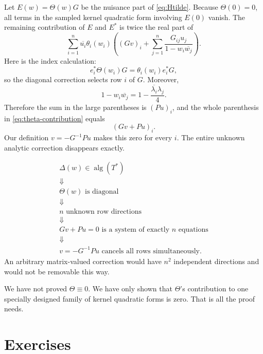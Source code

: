 \documentclass[11pt,oneside,openany]{book}
\theoremstyle{definition}
\theoremstyle{remark}
\newcommand{\alg}{\operatorname{alg}}
\begin{document}
Let \(E(w)=\Theta(w)G\) be the nuisance part of
\eqref{eq:Htilde}.  Because \(\Theta(0)=0\), all terms in the sampled
kernel quadratic form involving \(E(0)\) vanish.  The remaining
contribution of \(E\) and \(E^*\) is twice the real part of
\begin{equation}
  \sum_{i=1}^n\overline{u_i}\theta_i(w_i)
  \left(
    (Gv)_i+
    \sum_{j=1}^n
    \frac{G_{ij}u_j}{1-w_i\overline{w_j}}
  \right).
  \label{eq:theta-contribution}
\end{equation}
Here is the index calculation:
\[
  e_i^*\Theta(w_i)G=\theta_i(w_i)e_i^*G,
\]
so the diagonal correction selects row \(i\) of \(G\).  Moreover,
\[
  1-w_i\overline{w_j}
  =1-\frac{\overline{\lambda_i}\lambda_j}{4}.
\]
Therefore the sum in the large parentheses is \((Pu)_i\), and the
whole parenthesis in \eqref{eq:theta-contribution} equals
\[
  (Gv+Pu)_i.
\]
Our definition \(v=-G^{-1}Pu\) makes this zero for every \(i\).
The entire unknown analytic correction disappears exactly.

\begin{proofmap}
\[
\begin{array}{c}
\Delta(w)\in\alg(T^*)\\
\Downarrow\\
\Theta(w)\text{ is diagonal}\\
\Downarrow\\
n\text{ unknown row directions}\\
\Downarrow\\
Gv+Pu=0\text{ is a system of exactly \(n\) equations}\\
\Downarrow\\
v=-G^{-1}Pu\text{ cancels all rows simultaneously.}
\end{array}
\]
An arbitrary matrix-valued correction would have \(n^2\) independent
directions and would not be removable this way.
\end{proofmap}

\begin{pitfall}
We have not proved \(\Theta\equiv0\).  We have only shown that
\(\Theta\)'s contribution to one specially designed family of kernel
quadratic forms is zero.  That is all the proof needs.
\end{pitfall}

\section{Exercises}
\end{document}
